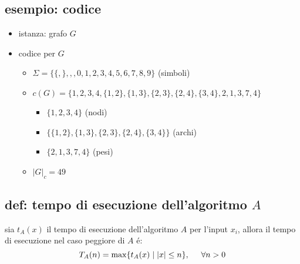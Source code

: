 \subsection*{\color{cyan} esempio: codice}
\begin{flushleft}
	\begin{itemize}
		\item istanza: grafo $G$
	\end{itemize}
\end{flushleft}
\begin{center}
\end{center}
\begin{flushleft}
	\begin{itemize}
		\item codice per $G$
		\begin{itemize}
			\item $\Sigma=\{\{,\},,,0,1,2,3,4,5,6,7,8,9\}$ (simboli)
			\item $c(G)=\{1,2,3,4,\{1,2\},\{1,3\},\{2,3\},\{2,4\},\{3,4\},2,1,3,7,4\}$
			\begin{itemize}
				\item $\{1,2,3,4\}$ (nodi)
				\item $\{\{1,2\},\{1,3\},\{2,3\},\{2,4\},\{3,4\}\}$ (archi)
				\item $\{2,1,3,7,4\}$ (pesi)
			\end{itemize}
			\item $|G|_{c}=49$
		\end{itemize}
	\end{itemize}
\end{flushleft}


\subsection*{\color{cyan} def: tempo di esecuzione dell'algoritmo $A$}
\begin{flushleft}
	sia $t_{A}(x)$ il tempo di esecuzione dell'algoritmo $A$ per l'input $x_{i}$, allora il tempo di esecuzione nel caso peggiore di $A$ \'e: $$T_{A}(n)=\max\{t_{A}(x)\hspace{0.1cm}|\hspace{0.1cm}|x|\leq n\},\hspace{0.5cm}\forall n>0$$
\end{flushleft}

